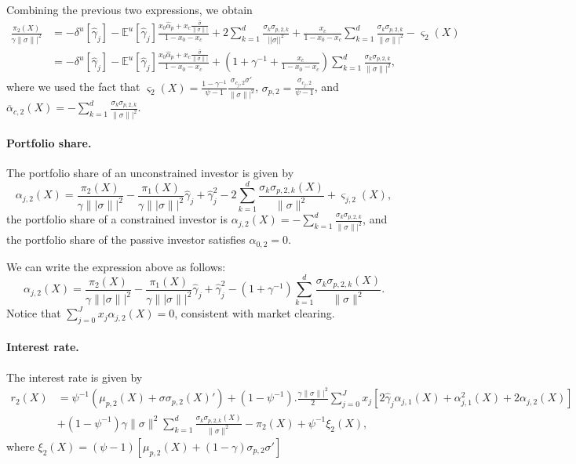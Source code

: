 Combining the previous two expressions, we obtain
\begin{align}
    \frac{\pi_2(X)}{\gamma \|\sigma\||^2} &=  -\delta^u[\hat{\gamma}_j] - \mathbb{E}^u[\hat{\gamma}_j] \frac{x_0 \hat{\alpha}_{p} + x_c \frac{\hat{\sigma}}{\|\sigma\||}}{1-x_0-x_c}  + 
    2\sum_{k=1}^d \frac{\sigma_k \sigma_{p,2,k}}{||\sigma||^ 2}
    +\frac{x_c}{1-x_0 -x_c} \sum_{k=1}^d  \frac{\sigma_k \sigma_{p,2,k}}{\|\sigma\||^2} - \varsigma_{2}(X) \nonumber\\
     &=  -\delta^u[\hat{\gamma}_j] - \mathbb{E}^u[\hat{\gamma}_j] \frac{x_0 \hat{\alpha}_{p} + x_c \frac{\hat{\sigma}}{\|\sigma\||}}{1-x_0-x_c}  
    +\left(1+\gamma^{-1}+\frac{x_c}{1-x_0 -x_c}\right) \sum_{k=1}^d  \frac{\sigma_k \sigma_{p,2,k}}{\|\sigma\||^2},
\end{align}
where we used the fact that $\varsigma_{2}(X) = \frac{1-\gamma^{-1}}{\psi-1} \frac{\sigma_{c_j,2}\sigma'}{\|\sigma\||^2}$, $\sigma_{p,2} = \frac{\sigma_{c_j,2}}{\psi-1}$, and $\overline{\alpha}_{c,2}(X) = - \sum_{k=1}^d  \frac{\sigma_k \sigma_{p,2,k}}{\|\sigma\||^2}$.

\paragraph{Portfolio share.} The portfolio share of an unconstrained investor is given by
\begin{equation}
    \alpha_{j,2}(X) = \frac{\pi_2(X)}{\gamma \||\sigma\||^2} - \frac{\pi_1(X)}{\gamma \||\sigma\||^2} \hat{\gamma}_j + \hat{\gamma}_j^2 - 2 \sum_{k=1}^d \frac{\sigma_k \sigma_{p,2,k}(X)}{\|\sigma\|^2} + \varsigma_{j,2}(X),
\end{equation}
the portfolio share of a constrained investor is $\alpha_{j,2}(X) = - \sum_{k=1}^d  \frac{\sigma_k \sigma_{p,2,k}}{\|\sigma\||^2}$, and the portfolio share of the passive investor satisfies $\alpha_{0,2} = 0$.

We can write the expression above as follows:
\begin{equation}
    \alpha_{j,2}(X) = \frac{\pi_2(X)}{\gamma \||\sigma\||^2} - \frac{\pi_1(X)}{\gamma \||\sigma\||^2} \hat{\gamma}_j + \hat{\gamma}_j^2 - (1+\gamma^{-1}) \sum_{k=1}^d \frac{\sigma_k \sigma_{p,2,k}(X)}{\|\sigma\|^2}.
\end{equation}
Notice that $\sum_{j=0}^J x_j \alpha_{j,2}(X) = 0 $, consistent with market clearing.


\paragraph{Interest rate.} The interest rate is given by
\begin{align}
    r_2(X) &= \psi^{-1} (\mu_{p,2}(X) + \sigma \sigma_{p,2}(X)' )  + (1-\psi^{-1}).\frac{\gamma \|\sigma\||^ 2}{2} \sum_{j=0}^J x_j \left[ 2\hat{\gamma}_j \alpha_{j,1}(X) + \alpha_{j,1}^2(X) + 2 \alpha_{j,2}(X)\right]\nonumber\\
    &+(1-\psi^{-1}) \gamma \|\sigma\|^ 2 \sum_{k=1}^d \frac{\sigma_k \sigma_{p,2,k}(X)}{\|\sigma\|^2} -\pi_2(X) + \psi^{-1} \xi_{2}(X),
\end{align}
where $\xi_2(X) = (\psi-1) \left[ \mu_{p,2}(X) + (1-\gamma) \sigma_{p,2} \sigma' \right]$

